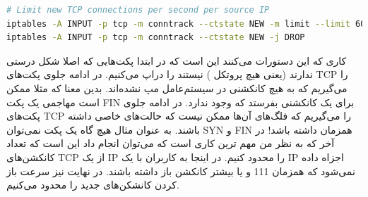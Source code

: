 \documentclass[]{article}
\begin{document}
\begin{enumerate}
\begin{latin}
\begin{lstlisting}[language=sh]
# Limit new TCP connections per second per source IP
iptables -A INPUT -p tcp -m conntrack --ctstate NEW -m limit --limit 60/s --limit-burst 20 -j ACCEPT
iptables -A INPUT -p tcp -m conntrack --ctstate NEW -j DROP
\end{lstlisting}
\end{latin}
    کاری که این دستورات می‌کنند این است که در ابتدا پکت‌هایی که اصلا شکل درستی ندارند (یعنی هیچ پروتکل ) نیستند
    را دراپ می‌کنیم. در ادامه جلوی پکت‌های TCP را می‌گیریم که به هیچ کانکشنی در سیستم‌عامل مپ نشده‌اند. بدین معنا که مثلا ممکن است مهاجمی
    یک پکت FIN برای یک کانکشنی بفرستد که وجود ندارد.
    در ادامه جلوی پکت‌های TCP را می‌گیریم که فلگ‌های آن‌ها ممکن نیست که حالت‌های خاصی داشته باشند. به عنوان مثال
    هیچ گاه یک پکت نمی‌توان SYN و FIN همزمان داشته باشد!
    در آخر که به نظر من مهم ترین کاری است که می‌توان انجام داد این است که تعداد کانکشن‌های TCP
    از یک IP را محدود کنیم. در اینجا به کاربران با یک IP اجزاه داده نمی‌شود که همزمان 111 و یا بیشتر کانکشن باز داشته باشند.
    در نهایت نیز سرعت باز کردن کانشکن‌های جدید را محدود می‌کنیم.
\end{enumerate}
\end{document}
